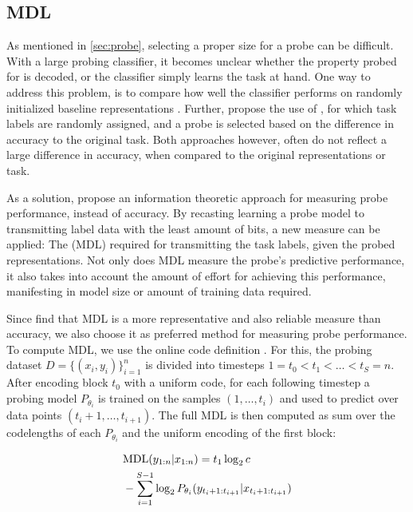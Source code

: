 \subsection{MDL}
As mentioned in \autoref{sec:probe}, selecting a proper size for a probe can be difficult. With a large probing classifier, it becomes unclear whether the property probed for is decoded, or the classifier simply learns the task at hand. One way to address this problem, is to compare how well the classifier performs on randomly initialized baseline representations \cite{zhang-bowman-2018-language}. Further, \cite{DBLP:journals/corr/abs-1909-03368} propose the use of , for which task labels are randomly assigned, and a probe is selected based on the difference in accuracy to the original task. Both approaches however, often do not reflect a large difference in accuracy, when compared to the original representations or task.

As a solution, \cite{voita-titov-2020-information} propose an information theoretic approach for measuring probe performance, instead of accuracy. By recasting learning a probe model to transmitting label data with the least amount of bits, a new measure can be applied: The  (MDL) required for transmitting the task labels, given the probed representations. Not only does MDL measure the probe's predictive performance, it also takes into account the amount of effort for achieving this performance, manifesting in model size or amount of training data required.

Since \cite{voita-titov-2020-information} find that MDL is a more representative and also reliable measure than accuracy, we also choose it as preferred method for measuring probe performance. To compute MDL, we use the online code definition \cite{Rissanen1984UniversalCI}.
For this, the probing dataset $D=\{(x_i, y_i)\}_{i=1}^n$ is divided into timesteps $1=t_0 < t_1 < \ldots < t_S = n$. After encoding block $t_0$ with a uniform code, for each following timestep a probing model $P_{\theta_i}$ is trained on the samples $(1, \ldots, t_i)$ and used to predict over data points $(t_i + 1,\ldots, t_{i + 1})$. The full MDL is then computed as sum over the codelengths of each $P_{\theta_i}$ and the uniform encoding of the first block:

\begin{equation}
    \begin{aligned}
         & \text{MDL}(y_{1:n} | x_{1:n}) = t_1 \log_2 c                                        \\
         & - \sum_{i=1}^{S-1} \log_2 P_{\theta_i}(y_{t_i + 1:t_{i+1}} | x_{t_i + 1:t_{i+1}})
    \end{aligned}
\end{equation}

